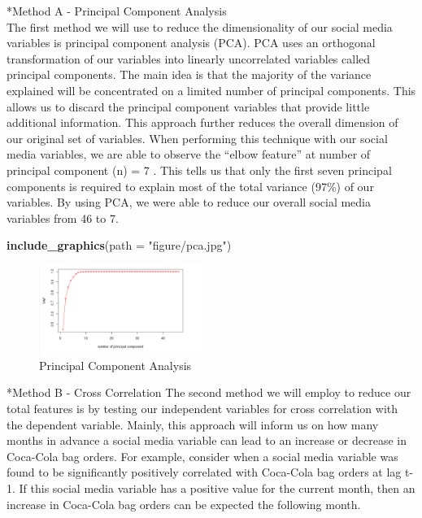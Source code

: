 \documentclass[12pt,oneside]{chicagocapstone}
\newenvironment{Shaded}{\begin{snugshade}}{\end{snugshade}}
\newcommand{\KeywordTok}[1]{\textcolor[rgb]{0.13,0.29,0.53}{\textbf{#1}}}
\newcommand{\DataTypeTok}[1]{\textcolor[rgb]{0.13,0.29,0.53}{#1}}
\newcommand{\StringTok}[1]{\textcolor[rgb]{0.31,0.60,0.02}{#1}}
\newcommand{\NormalTok}[1]{#1}
\begin{document}
*Method A - Principal Component Analysis\\
The first method we will use to reduce the dimensionality of our social
media variables is principal component analysis (PCA). PCA uses an
orthogonal transformation of our variables into linearly uncorrelated
variables called principal components. The main idea is that the
majority of the variance explained will be concentrated on a limited
number of principal components. This allows us to discard the principal
component variables that provide little additional information. This
approach further reduces the overall dimension of our original set of
variables. When performing this technique with our social media
variables, we are able to observe the ``elbow feature'' at number of
principal component (n) = 7 . This tells us that only the first seven
principal components is required to explain most of the total variance
(97\%) of our variables. By using PCA, we were able to reduce our
overall social media variables from 46 to 7.
\begin{Shaded}
\begin{Highlighting}[]
\KeywordTok{include_graphics}\NormalTok{(}\DataTypeTok{path =} \StringTok{"figure/pca.jpg"}\NormalTok{)}
\end{Highlighting}
\end{Shaded}
\begin{figure}

{\centering \includegraphics[width=200px]{figure/pca} 

}

\caption{Principal Component Analysis}\label{fig:pca}
\end{figure}
*Method B - Cross Correlation The second method we will employ to reduce
our total features is by testing our independent variables for cross
correlation with the dependent variable. Mainly, this approach will
inform us on how many months in advance a social media variable can lead
to an increase or decrease in Coca-Cola bag orders. For example,
consider when a social media variable was found to be significantly
positively correlated with Coca-Cola bag orders at lag t-1. If this
social media variable has a positive value for the current month, then
an increase in Coca-Cola bag orders can be expected the following month.
\end{document}
